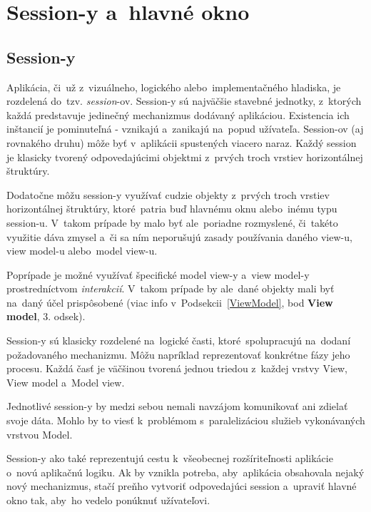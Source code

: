 \section{Session-y a~hlavné okno}\label{sessions_hlavne_okno}

\subsection{Session-y}\label{Sessions}

Aplikácia, či~už z~vizuálneho, logického alebo~implementačného hladiska, je rozdelená do~tzv. \textit{session}-ov. Session-y sú najväčšie stavebné jednotky, z~ktorých každá predstavuje jedinečný mechanizmus dodávaný aplikáciou. Existencia ich inštancií je pominuteľná - vznikajú a~zanikajú na~popud užívateľa. Session-ov (aj rovnakého druhu) môže byť v~aplikácii spustených viacero naraz. Každý session je klasicky tvorený odpovedajúcimi objektmi z~prvých troch vrstiev horizontálnej štruktúry. 

Dodatočne môžu session-y využívať cudzie objekty z~prvých troch vrstiev horizontálnej štruktúry, ktoré~patria buď hlavnému oknu alebo~inému typu session-u. V~takom prípade by malo byť ale~poriadne rozmyslené, či~takéto  využitie dáva zmysel a~či sa ním neporušujú zasady používania daného view-u, view model-u alebo~model view-u. 

Poprípade je možné využívať špecifické model view-y a~view model-y prostredníctvom \textit{interakcií}. V~takom prípade by ale~dané objekty mali byť na~daný účel prispôsobené (viac info v~Podsekcii~\ref{ViewModel}, bod \textbf{View model}, 3. odsek).

Session-y sú klasicky rozdelené na~logické časti, ktoré~spolupracujú na~dodaní požadovaného mechanizmu. Môžu napríklad reprezentovať konkrétne fázy jeho procesu. Každá časť je väčšinou tvorená jednou triedou z~každej vrstvy View, View model a~Model view.  %

Jednotlivé session-y by medzi sebou nemali navzájom komunikovať ani zdielať svoje dáta. Mohlo by to viesť k~problémom s~paralelizáciou služieb vykonávaných vrstvou Model.

Session-y ako také reprezentujú cestu k~všeobecnej rozšíriteľnosti aplikácie o~novú aplikačnú logiku. Ak by vznikla potreba, aby~aplikácia obsahovala nejaký nový mechanizmus, stačí preňho vytvoriť odpovedajúci session a~upraviť hlavné okno tak, aby~ho vedelo ponúknuť užívateľovi.  

